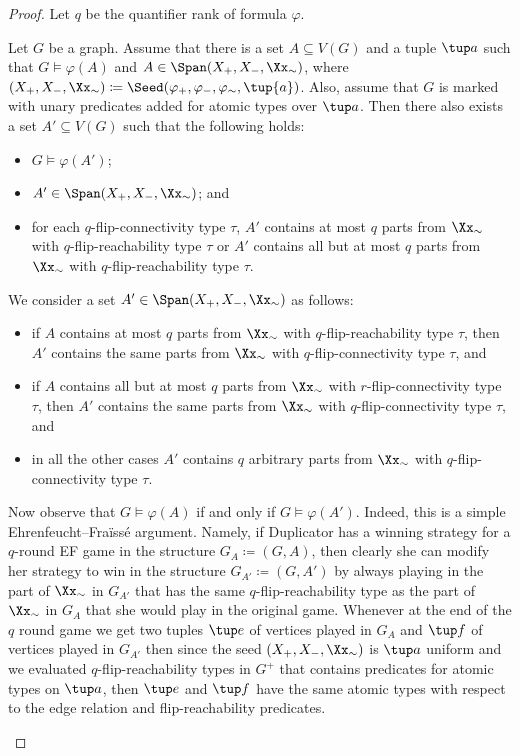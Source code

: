 \begin{proof}
    Let $q$ be the quantifier rank of formula $\varphi$.
    \begin{claim}
        Let $G$ be a graph. Assume that there is a set $A \subseteq V(G)$ and a tuple $\tup a$ such that $G\models \varphi(A)$ and $A\in \Span(X_+, X_-, \Xx_{\sim})$, where $(X_+, X_-, \Xx_{\sim}) \coloneqq \Seed(\varphi_+, \varphi_-, \varphi_{\sim}, \tup{a})$. Also, assume that $G$ is marked with unary predicates added for atomic types over $\tup a$. Then there also exists a set $A'\subseteq V(G)$ such that the following holds:
        \begin{itemize}[nosep]
            \item $G\models \varphi(A')$;
            \item $A'\in \Span(X_+, X_-, \Xx_{\sim})$; and
            \item for each $q$-flip-connectivity type $\tau$, $A'$ contains at most $q$ parts from $\Xx_{\sim}$ with $q$-flip-reachability type $\tau$ or $A'$ contains all but at most $q$ parts from $\Xx_{\sim}$ with $q$-flip-reachability type $\tau$.
        \end{itemize}
    \end{claim}
    \begin{claimproof}
        We consider a set $A' \in \Span(X_+, X_-, \Xx_{\sim})$ as follows:
        \begin{itemize}[nosep]
            \item if $A$ contains at most $q$ parts from $\Xx_{\sim}$ with $q$-flip-reachability type $\tau$, then $A'$ contains the same parts from $\Xx_{\sim}$ with $q$-flip-connectivity type $\tau$, and
            \item if $A$ contains all but at most $q$ parts from $\Xx_{\sim}$ with $r$-flip-connectivity type $\tau$, then $A'$ contains the same parts from $\Xx_{\sim}$ with $q$-flip-connectivity type $\tau$, and
            \item in all the other cases $A'$ contains $q$ arbitrary parts from $\Xx_{\sim}$ with $q$-flip-connectivity type $\tau$.
        \end{itemize}


        Now observe that $G \models \varphi(A)$ if and only if $G \models \varphi(A')$.
        Indeed, this is a simple Ehrenfeucht--Fraïssé argument.
        Namely, if Duplicator has a winning strategy for a $q$-round EF game in the structure $G_A \coloneqq (G, A)$, then clearly she can modify her strategy to win in the structure $G_{A'} \coloneqq (G, A')$ by always playing in the part of $\Xx_{\sim}$ in $G_{A'}$ that has the same $q$-flip-reachability type as the part of $\Xx_\sim$ in $G_A$ that she would play in the original game.
        Whenever at the end of the $q$ round game we get two tuples $\tup e$ of vertices played in $G_A$ and $\tup f$ of vertices played in $G_{A'}$ then since the seed $(X_+, X_-, \Xx_{\sim})$ is $\tup a$ uniform and we evaluated $q$-flip-reachability types in $G^+$ that contains predicates for atomic types on $\tup a$, then $\tup e$ and $\tup f$ have the same atomic types with respect to the edge relation and flip-reachability predicates.
    \end{claimproof}
    


\end{proof}
